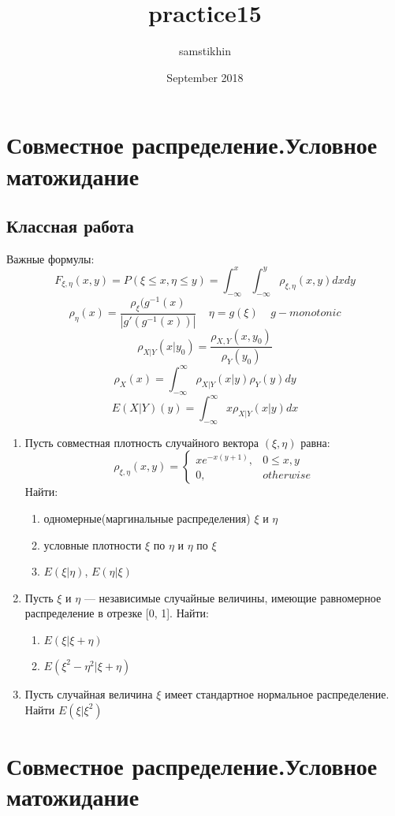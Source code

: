 \documentclass[a4paper, 14pt]{extarticle}
\title{practice15}
\author{samstikhin}
\date{September 2018}
\begin{document}
\section*{Совместное распределение.Условное матожидание}
\subsection*{Классная работа}
Важные формулы:
$$F_{\xi,\eta}(x,y) = P(\xi \leq x, \eta \leq y) = \int_{-\infty}^{x}\int_{-\infty}^{y}\rho_{\xi,\eta}(x,y)dxdy$$
$$\rho_{\eta}(x) = \frac{\rho_{\xi}(g^{-1}(x)}{|g'(g^{-1}(x))|}~~~~~\eta = g(\xi)~~~~~g - monotonic$$
$$\rho_{X|Y}(x|y_0) = \frac{\rho_{X,Y}(x, y_0)}{\rho_{Y}(y_0)}$$
$$\rho_{X}(x) = \int_{-\infty}^{\infty} \rho_{X|Y}(x|y)\rho_{Y}(y)dy$$
$$E(X|Y)(y) = \int_{-\infty}^{\infty}x\rho_{X|Y}(x|y)dx$$
\begin{enumerate}
\item Пусть совместная плотность случайного вектора $(\xi, \eta)$ равна:
$$\rho_{\xi,\eta}(x,y) =\left\{
	\begin{array}{cc}
	xe^{-x(y+1)}, & 0\leq x,y\\
	0, & otherwise
	\end{array}\right.$$
Найти:
\begin{enumerate}
\item одномерные(маргинальные распределения) $\xi$ и $\eta$
\item условные плотности $\xi$ по $\eta$ и $\eta$ по $\xi$
\item $E(\xi|\eta)$, $E(\eta|\xi)$
\end{enumerate}

\item Пусть $\xi$ и $\eta$ — независимые случайные величины, имеющие
равномерное распределение в отрезке [0, 1]. Найти:
\begin{enumerate}
\item $E(\xi|\xi + \eta)$
\item $E(\xi^2 - \eta^2 |\xi + \eta)$
\end{enumerate}

\item Пусть случайная величина $\xi$ имеет стандартное нормальное
распределение. Найти $E(\xi|\xi^2)$
\end{enumerate}
\newpage

\section*{Совместное распределение.Условное матожидание}
\end{document}
